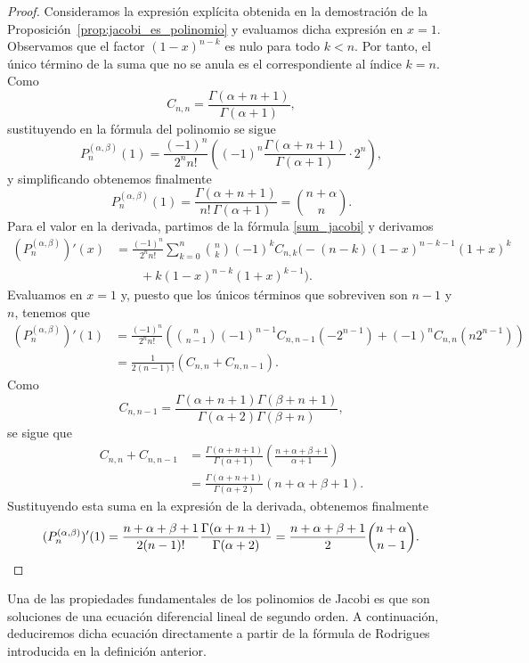 \documentclass[12pt,a4paper]{book}
\begin{document}
\begin{proof}
Consideramos la expresión explícita obtenida en la demostración de la Proposición~\ref{prop:jacobi_es_polinomio} y evaluamos dicha expresión en $x=1$. Observamos que el factor $(1-x)^{n-k}$ es nulo para todo $k < n$. Por tanto, el único término de la suma que no se anula es el correspondiente al índice $k=n$. Como
\[
C_{n,n} = \frac{\Gamma(\alpha+n+1)}{\Gamma(\alpha+1)},
\]
sustituyendo en la fórmula del polinomio se sigue
\[
P_n^{(\alpha, \beta)}(1) = \frac{(-1)^n}{2^n n!} \left( (-1)^n \frac{\Gamma(\alpha+n+1)}{\Gamma(\alpha+1)} \cdot 2^n \right),
\]
y simplificando obtenemos finalmente
\[
P_n^{(\alpha, \beta)}(1) = \frac{\Gamma(\alpha+n+1)}{n! \, \Gamma(\alpha+1)} = \binom{n+\alpha}{n}.
\]
Para el valor en la derivada, partimos de la fórmula \eqref{sum_jacobi}  y derivamos
\begin{align*}
    (P_n^{(\alpha, \beta)})'(x) &= \frac{(-1)^n}{2^n n!} \sum_{k=0}^n \binom{n}{k} (-1)^k C_{n,k} \big( -(n-k)(1-x)^{n-k-1}(1+x)^k \\
    &\qquad + k(1-x)^{n-k}(1+x)^{k-1} \big).
\end{align*}
Evaluamos en $x=1$ y, puesto que los únicos términos que sobreviven son $n-1$ y $n$, tenemos que
\begin{align*}
    (P_n^{(\alpha, \beta)})'(1) &= \frac{(-1)^n}{2^n n!} \left( \binom{n}{n-1} (-1)^{n-1} C_{n,n-1} ( -2^{n-1} ) + (-1)^n C_{n,n} ( n2^{n-1} ) \right) \\
    &= \frac{1}{2(n-1)!} \left( C_{n,n} + C_{n,n-1} \right).
\end{align*}
Como
\[
C_{n,n-1} = \frac{\Gamma(\alpha+n+1)\Gamma(\beta+n+1)}{\Gamma(\alpha+2)\Gamma(\beta + n)},
\]
se sigue que
\begin{align*}
    C_{n,n} + C_{n,n-1} &= \frac{\Gamma(\alpha+n+1)}{\Gamma(\alpha+1)} \left( \frac{n+\alpha+\beta+1}{\alpha+1} \right)\\ 
    &= \frac{\Gamma(\alpha+n+1)}{\Gamma(\alpha+2)} (n+\alpha+\beta+1).
\end{align*}
Sustituyendo esta suma en la expresión de la derivada, obtenemos finalmente
\begin{equation*}
    (P_n^{(\alpha, \beta)})'(1) = \frac{n+\alpha+\beta+1}{2(n-1)!}  \frac{\Gamma(\alpha+n+1)}{\Gamma(\alpha+2)} = \frac{n+\alpha+\beta+1}{2} \binom{n+\alpha}{n-1}.
    \qedhere
\end{equation*}
\end{proof}

Una de las propiedades fundamentales de los polinomios de Jacobi es que son soluciones de una ecuación diferencial lineal de segundo orden. A continuación, deduciremos dicha ecuación directamente a partir de la fórmula de Rodrigues introducida en la definición anterior.
\end{document}
